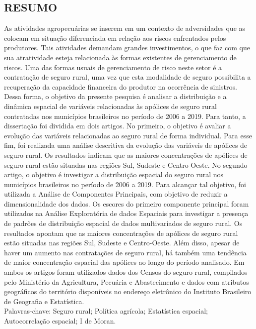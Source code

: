 
\begin{singlespace}
\begin{center}
\section*{RESUMO}
\end{center}
As atividades agropecuárias se inserem em um contexto de adversidades que as colocam em situação diferenciada em relação aos riscos enfrentados pelos produtores. Tais atividades demandam grandes investimentos, o que faz com que sua atratividade esteja relacionada às formas existentes de gerenciamento de riscos. Uma das formas usuais de gerenciamento de risco neste setor é a contratação de seguro rural, uma vez que esta modalidade de seguro possibilita a recuperação da capacidade financeira do produtor na ocorrência de sinistros. Dessa forma, o objetivo da presente pesquisa é analisar a distribuição e a dinâmica espacial de variáveis relacionadas às apólices de seguro rural contratadas nos municípios brasileiros no período de 2006 a 2019. Para tanto, a dissertação foi dividida em dois artigos. No primeiro, o objetivo é avaliar a evolução das variáveis relacionadas ao seguro rural de forma individual. Para esse fim, foi realizada uma análise descritiva da evolução das variáveis de apólices de seguro rural. Os resultados indicam que as maiores concentrações de apólices de seguro rural estão situadas nas regiões Sul, Sudeste e Centro-Oeste. No segundo artigo, o objetivo é investigar a distribuição espacial do seguro rural nos municípios brasileiros no período de 2006 a 2019. Para alcançar tal objetivo, foi utilizada a Análise de Componentes Principais, com objetivo de reduzir a dimensionalidade dos dados. Os escores do primeiro componente principal foram  utilizados na Análise Exploratória de dados Espaciais para investigar a presença de padrões de distribuição espacial de dados multivariados de seguro rural. Os resultados apontam que as maiores concentrações de apólices de seguro rural estão situadas nas regiões Sul, Sudeste e Centro-Oeste. Além disso, apesar de haver um aumento nas contratações de seguro rural, há também uma tendência de maior concentração espacial das apólices ao longo do período analisado. Em ambos os artigos foram utilizados dados dos Censos do seguro rural, compilados pelo Ministério da Agricultura, Pecuária e Abastecimento e dados com atributos geográficos do território disponíveis no endereço eletrônico do Instituto Brasileiro de Geografia e Estatística.\\
\newline
\noindent Palavras-chave: Seguro rural; Política agrícola; Estatística espacial; Autocorrelação espacial; \hspace*{6.4em} I de Moran.
\end{singlespace}



